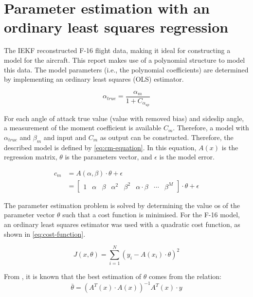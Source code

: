 \section{Parameter estimation with an ordinary least squares regression}
The IEKF reconstructed F-16 flight data, making it ideal for constructing a model for the aircraft. This report makes use of a polynomial structure to model this data. The model parameters (i.e., the polynomial coefficients) are determined by implementing an ordinary least squares (OLS) estimator. 

\begin{equation}\label{eq:alpha-relation}
  \alpha_{true} = \frac{\alpha_m}{1+C_{\alpha_{up}}}
\end{equation}

For each angle of attack true value (value with removed bias) and sideslip angle, a measurement of the moment coefficient is available $C_m$. Therefore, a model with $\alpha_{true}$ and $\beta_m$ and input and $C_m$ as output can be constructed. Therefore, the described model is defined by \autoref{eq:cm-equation}. In this equation, $A(x)$ is the regression matrix, $\theta$ is the parameters vector, and $\epsilon$ is the model error. 

\begin{align}\label{eq:cm-equation}
  c_m &= A(\alpha , \beta)\cdot \theta + \epsilon \\
   &= \begin{bmatrix}
1 &\alpha & \beta & \alpha^2 & \beta^2 & \alpha\cdot\beta & \cdots & \beta^M
\end{bmatrix}\cdot \theta + \epsilon
\end{align}


The parameter estimation problem is solved by determining the value os of the parameter vector $\theta$ such that a cost function is minimised. For the F-16 model, an ordinary least squares estimator was used with a quadratic cost function, as shown in \autoref{eq:cost-function}. 

\begin{equation}\label{eq:cost-function}
	J(x, \theta) = \sum^N_{i=1}(y_i-A(x_i)\cdot\theta)^2
\end{equation}

From , it is known that the best estimation of $\theta$ comes from the relation:
\begin{equation*}
	\bar{\theta}=(A^T(x)\cdot A(x))^{-1}A^T(x)\cdot y
\end{equation*}


